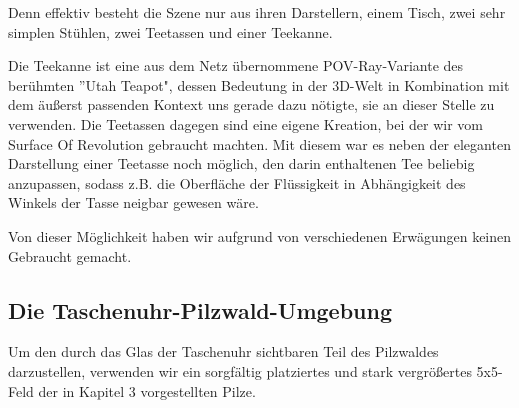 \documentclass[twocolumn]{article}
\begin{document}
Denn effektiv besteht die Szene nur aus ihren Darstellern, einem Tisch, zwei sehr simplen Stühlen, zwei Teetassen und einer Teekanne.

Die Teekanne ist eine aus dem Netz übernommene POV-Ray-Variante des berühmten ''Utah Teapot", dessen Bedeutung in der 3D-Welt in Kombination mit dem äußerst passenden Kontext uns gerade dazu nötigte, sie an dieser Stelle zu verwenden.
Die Teetassen dagegen sind eine eigene Kreation, bei der wir vom Surface Of Revolution gebraucht machten. Mit diesem war es neben der eleganten Darstellung einer Teetasse noch möglich, den darin enthaltenen Tee beliebig anzupassen, sodass z.B. die Oberfläche der Flüssigkeit in Abhängigkeit des Winkels der Tasse neigbar gewesen wäre.

Von dieser Möglichkeit haben wir aufgrund von verschiedenen Erwägungen keinen Gebraucht gemacht.


\subsection{Die Taschenuhr-Pilzwald-Umgebung}
Um den durch das Glas der Taschenuhr sichtbaren Teil des Pilzwaldes darzustellen, verwenden wir ein sorgfältig platziertes und stark vergrößertes 5x5-Feld der in Kapitel 3 vorgestellten Pilze.
\end{document}
